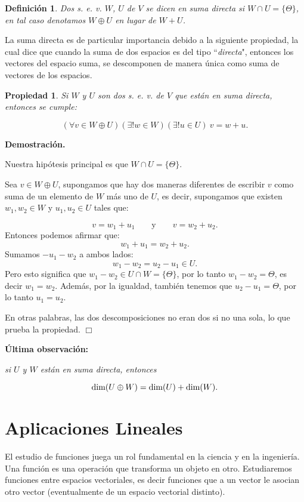 \documentclass[12pt]{book}
\newtheorem{defi}{Definici\'on}
\newtheorem{prop}{Propiedad}
\def\pq{\vspace{0.5cm}}
\begin{document}
\begin{defi}
Dos s. e. v. $W$, $U$ de $V$ se dicen en \emph{suma directa} si $W\cap U=\{\Theta\}$, en tal caso denotamos $W\oplus U$ en lugar de $W+U$.
\end{defi}

La suma directa es de particular importancia debido a la siguiente propiedad, la cual dice que cuando la suma de dos espacios es del tipo ``\emph{directa}", entonces los vectores del espacio suma, se descomponen de manera única como suma de vectores de los espacios.

\begin{prop}
Si $W$ y $U$ son dos s. e. v. de $V$ que est\'an en suma directa, entonces se cumple:

\[ (\forall v\in W\oplus U)(\exists! w\in W)(\exists! u\in U)\ v=w+u.\]
\end{prop}
{\bf Demostración.} {
Nuestra hipótesis principal es que $W\cap U=\{\Theta\}$.

Sea  $v\in W\oplus U$, supongamos que hay dos maneras diferentes de escribir $v$ como suma de un elemento de $W$ más uno de $U$, es decir, supongamos que existen $w_1,w_2\in W$ y $u_1, u_2\in U$ tales que:

$$ v= w_1+u_1\qquad\textrm{y}\qquad v=w_2+u_2.$$
Entonces podemos afirmar que:
$$w_1+u_1=w_2+u_2.$$
Sumamos $-u_1-w_2$ a ambos lados:
$$w_1-w_2=u_2-u_1\in U.$$
Pero esto significa que $w_1-w_2\in U\cap W=\{\Theta\}$, por lo tanto $w_1-w_2=\Theta$, es decir $w_1=w_2$.
Además, por la igualdad, también tenemos que $u_2-u_1=\Theta$, por lo tanto $u_1=u_2$.

En otras palabras, las dos descomposiciones no eran dos si no una sola, lo que prueba la propiedad.
\hfill $\Box$
}
\pq

{\bf Última observación:} {\em si $U$ y $W$ est\'an en suma directa, entonces 

\[\textup{dim}(U\oplus W)=\textup{dim}(U)+\textup{dim}(W).\]
}

\chapter{Aplicaciones Lineales}

El estudio de funciones juega un rol fundamental en la ciencia y en la ingeniería.
Una función es una operación que transforma un objeto en otro.
Estudiaremos funciones entre espacios vectoriales, es decir funciones que a un vector le asocian otro vector (eventualmente de un espacio vectorial distinto).
\end{document}

